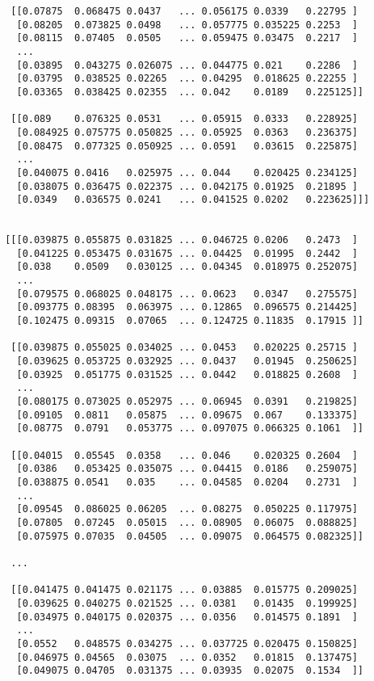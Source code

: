 \documentclass[
  letterpaper,
  DIV=11,
  numbers=noendperiod]{scrreprt}
\begin{document}
\begin{verbatim}
  [[0.07875  0.068475 0.0437   ... 0.056175 0.0339   0.22795 ]
   [0.08205  0.073825 0.0498   ... 0.057775 0.035225 0.2253  ]
   [0.08115  0.07405  0.0505   ... 0.059475 0.03475  0.2217  ]
   ...
   [0.03895  0.043275 0.026075 ... 0.044775 0.021    0.2286  ]
   [0.03795  0.038525 0.02265  ... 0.04295  0.018625 0.22255 ]
   [0.03365  0.038425 0.02355  ... 0.042    0.0189   0.225125]]

  [[0.089    0.076325 0.0531   ... 0.05915  0.0333   0.228925]
   [0.084925 0.075775 0.050825 ... 0.05925  0.0363   0.236375]
   [0.08475  0.077325 0.050925 ... 0.0591   0.03615  0.225875]
   ...
   [0.040075 0.0416   0.025975 ... 0.044    0.020425 0.234125]
   [0.038075 0.036475 0.022375 ... 0.042175 0.01925  0.21895 ]
   [0.0349   0.036575 0.0241   ... 0.041525 0.0202   0.223625]]]


 [[[0.039875 0.055875 0.031825 ... 0.046725 0.0206   0.2473  ]
   [0.041225 0.053475 0.031675 ... 0.04425  0.01995  0.2442  ]
   [0.038    0.0509   0.030125 ... 0.04345  0.018975 0.252075]
   ...
   [0.079575 0.068025 0.048175 ... 0.0623   0.0347   0.275575]
   [0.093775 0.08395  0.063975 ... 0.12865  0.096575 0.214425]
   [0.102475 0.09315  0.07065  ... 0.124725 0.11835  0.17915 ]]

  [[0.039875 0.055025 0.034025 ... 0.0453   0.020225 0.25715 ]
   [0.039625 0.053725 0.032925 ... 0.0437   0.01945  0.250625]
   [0.03925  0.051775 0.031525 ... 0.0442   0.018825 0.2608  ]
   ...
   [0.080175 0.073025 0.052975 ... 0.06945  0.0391   0.219825]
   [0.09105  0.0811   0.05875  ... 0.09675  0.067    0.133375]
   [0.08775  0.0791   0.053775 ... 0.097075 0.066325 0.1061  ]]

  [[0.04015  0.05545  0.0358   ... 0.046    0.020325 0.2604  ]
   [0.0386   0.053425 0.035075 ... 0.04415  0.0186   0.259075]
   [0.038875 0.0541   0.035    ... 0.04585  0.0204   0.2731  ]
   ...
   [0.09545  0.086025 0.06205  ... 0.08275  0.050225 0.117975]
   [0.07805  0.07245  0.05015  ... 0.08905  0.06075  0.088825]
   [0.075975 0.07035  0.04505  ... 0.09075  0.064575 0.082325]]

  ...

  [[0.041475 0.041475 0.021175 ... 0.03885  0.015775 0.209025]
   [0.039625 0.040275 0.021525 ... 0.0381   0.01435  0.199925]
   [0.034975 0.040175 0.020375 ... 0.0356   0.014575 0.1891  ]
   ...
   [0.0552   0.048575 0.034275 ... 0.037725 0.020475 0.150825]
   [0.046975 0.04565  0.03075  ... 0.0352   0.01815  0.137475]
   [0.049075 0.04705  0.031375 ... 0.03935  0.02075  0.1534  ]]


\end{verbatim}
\end{document}
